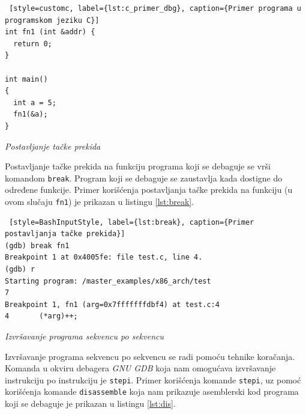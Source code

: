 \documentclass[12pt,oneside]{memoir}
\begin{document}
\begin{lstlisting} [style=customc, label={lst:c_primer_dbg}, caption={Primer programa u programskom jeziku C}]
int fn1 (int &addr) {
  return 0;
}

int main()
{
  int a = 5;
  fn1(&a);
}
\end{lstlisting}

\begin{description}

\item{\emph{Postavljanje tačke prekida}}

Postavljanje tačke prekida na funkciju programa koji se debaguje se vrši komandom \texttt{break}. Program koji se debaguje se zaustavlja kada dostigne do određene funkcije. Primer korišćenja postavljanja tačke prekida na funkciju (u ovom slučaju \texttt{fn1}) je prikazan u listingu \ref{lst:break}.

\begin{lstlisting} [style=BashInputStyle, label={lst:break}, caption={Primer postavljanja tačke prekida}]
(gdb) break fn1
Breakpoint 1 at 0x4005fe: file test.c, line 4.
(gdb) r
Starting program: /master_examples/x86_arch/test 
7
Breakpoint 1, fn1 (arg=0x7fffffffdbf4) at test.c:4
4		(*arg)++;
\end{lstlisting}

\item{\emph{Izvršavanje programa sekvencu po sekvencu}}

Izvršavanje programa sekvencu po sekvencu se radi pomoću tehnike koračanja. Komanda u okviru debagera \emph{GNU GDB} koja nam omogućava izvršavanje instrukciju po instrukciju je \texttt{stepi}. Primer korišćenja komande \texttt{stepi}, uz pomoć korišćenja komande \texttt{disassemble} koja nam prikazuje asemblerski kod programa koji se debaguje je prikazan u listingu \ref{lst:dis}.\newpage


\end{description}
\end{document}
